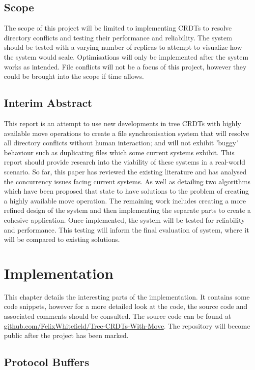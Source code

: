 \documentclass[12pt]{report}
\begin{document}
\section{Scope}
The scope of this project will be limited to implementing CRDTs to resolve directory conflicts and
testing their performance and reliability. The system should be tested with a varying number of
replicas to attempt to visualize how the system would scale. Optimisations will only be
implemented after the system works as intended.
File conflicts will not be a focus of this project, however they could be brought into the scope if
time allows.

\section{Interim Abstract}
This report is an attempt to use new developments in tree CRDTs with
highly available move operations to create a file synchronisation system that
will resolve all directory conflicts without human interaction; and will not
exhibit ’buggy’ behaviour such as duplicating files which some current systems exhibit. This report should provide research into the viability of these
systems in a real-world scenario. So far, this paper has reviewed the existing
literature and has analysed the concurrency issues facing current systems. As
well as detailing two algorithms which have been proposed that state to have
solutions to the problem of creating a highly available move operation.
The remaining work includes creating a more refined design of the system and
then implementing the separate parts to create a cohesive application. Once
implemented, the system will be tested for reliability and performance. This
testing will inform the final evaluation of system, where it will be compared
to existing solutions.

\chapter{Implementation}

This chapter details the interesting parts of the implementation. It contains some code snippets, however for a more detailed look at the code, the source code and associated comments should be consulted. The source code can be found at \url{github.com/FelixWhitefield/Tree-CRDTs-With-Move}. The repository will become public after the project has been marked.

\newpage
\section{Protocol Buffers}\label{app:protobuf}
\end{document}
